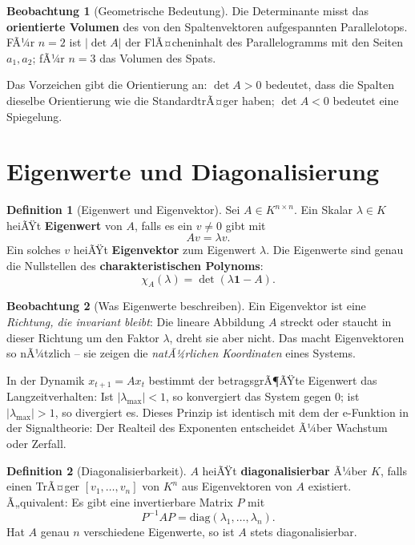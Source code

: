 ﻿\documentclass[a4paper,12pt]{report}
\theoremstyle{definition}
\newtheorem{definition}{Definition}
\newtheorem{beobachtung}{Beobachtung}
\begin{document}
\begin{beobachtung}[Geometrische Bedeutung]
    Die Determinante misst das \textbf{orientierte Volumen} des von den
    Spaltenvektoren aufgespannten Parallelotops. FÃ¼r $n = 2$ ist $|\det A|$
    der FlÃ¤cheninhalt des Parallelogramms mit den Seiten $a_1, a_2$;
    fÃ¼r $n = 3$ das Volumen des Spats.

    Das Vorzeichen gibt die Orientierung an: $\det A > 0$ bedeutet, dass
    die Spalten dieselbe Orientierung wie die StandardtrÃ¤ger haben;
    $\det A < 0$ bedeutet eine Spiegelung.
\end{beobachtung}

\section{Eigenwerte und Diagonalisierung}

\begin{definition}[Eigenwert und Eigenvektor]
    Sei $A \in K^{n \times n}$. Ein Skalar $\lambda \in K$ heiÃŸt
    \textbf{Eigenwert} von $A$, falls es ein $v \neq 0$ gibt mit
    \[
        Av = \lambda v.
    \]
    Ein solches $v$ heiÃŸt \textbf{Eigenvektor} zum Eigenwert $\lambda$.
    Die Eigenwerte sind genau die Nullstellen des
    \textbf{charakteristischen Polynoms}:
    \[
        \chi_A(\lambda) = \det(\lambda \mathbf{1} - A).
    \]
\end{definition}

\begin{beobachtung}[Was Eigenwerte beschreiben]
    Ein Eigenvektor ist eine \emph{Richtung, die invariant bleibt}: Die
    lineare Abbildung $A$ streckt oder staucht in dieser Richtung um den
    Faktor $\lambda$, dreht sie aber nicht. Das macht Eigenvektoren so
    nÃ¼tzlich -- sie zeigen die \emph{natÃ¼rlichen Koordinaten} eines Systems.

    In der Dynamik $x_{t+1} = Ax_t$ bestimmt der betragsgrÃ¶ÃŸte Eigenwert
    das Langzeitverhalten: Ist $|\lambda_{\max}| < 1$, so konvergiert das
    System gegen $0$; ist $|\lambda_{\max}| > 1$, so divergiert es.
    Dieses Prinzip ist identisch mit dem der e-Funktion in der Signaltheorie:
    Der Realteil des Exponenten entscheidet Ã¼ber Wachstum oder Zerfall.
\end{beobachtung}

\begin{definition}[Diagonalisierbarkeit]
    $A$ heiÃŸt \textbf{diagonalisierbar} Ã¼ber $K$, falls einen TrÃ¤ger
    $[v_1, \dots, v_n]$ von $K^n$ aus Eigenvektoren von $A$ existiert.
    Ã„quivalent: Es gibt eine invertierbare Matrix $P$ mit
    \[
        P^{-1} A P = \mathrm{diag}(\lambda_1, \dots, \lambda_n).
    \]
    Hat $A$ genau $n$ verschiedene Eigenwerte, so ist $A$ stets
    diagonalisierbar.
\end{definition}
\end{document}
